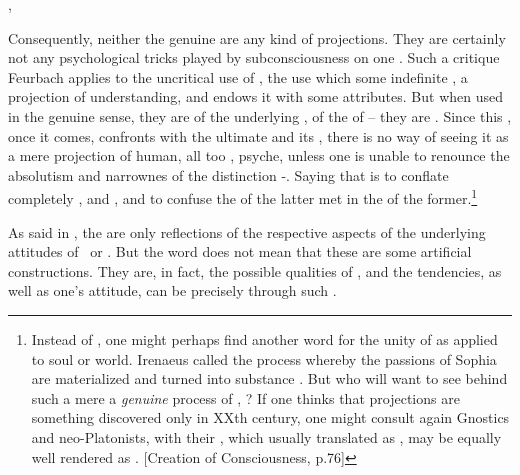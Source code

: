 \sep


\pa Consequently, neither the genuine  are any kind of
projections.  They are certainly not any psychological tricks played
by subconsciousness on one .
Such a critique  Feurbach applies to the uncritical use
of , the use which  some indefinite
, a projection of  understanding, and endows
it with some attributes.  But when used in the genuine sense, they are
 of the underlying , of the
 of  -- they are .  Since
this , once it comes, confronts  with the
ultimate  and its , there is no way of
seeing it as a mere projection of human, all too ,
psyche, unless one is unable to renounce the absolutism and narrownes
of the distinction -.  Saying that
 is to conflate completely
,  and , and to confuse the
 of the latter met in the  of the
former.\footnote{Instead of , one might perhaps find
another word for the unity of  as applied to
soul or world.  Irenaeus called the process whereby the passions of
Sophia are materialized and turned into substance
.   But who will want to see behind
such a mere  a {\em genuine} process of ,
?  If one thinks that projections are something
discovered only in XXth century, one might consult again Gnostics and
neo-Platonists, with their , which usually translated
as , may be equally well rendered as . 
[Creation of Consciousness, p.76] }


\pa As said in , the  are only
reflections of the respective aspects of the underlying attitudes of
\yes\ or \No.  But the word  does not mean that
these are some artificial constructions.  They are, in fact, the
possible qualities of , and the tendencies, as well as 
one's attitude, can be  precisely through such
.

